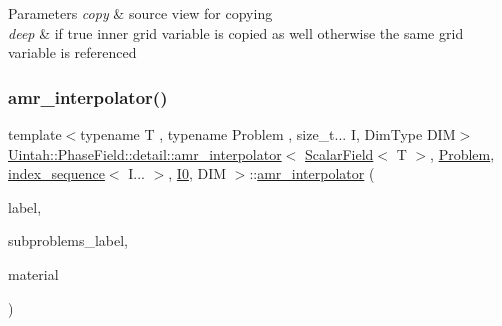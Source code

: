 \begin{DoxyParams}{Parameters}
{\em copy} & source view for copying \\
\hline
{\em deep} & if true inner grid variable is copied as well otherwise the same grid variable is referenced \\
\hline
\end{DoxyParams}
\mbox{\label{classUintah_1_1PhaseField_1_1detail_1_1amr__interpolator_3_01ScalarField_3_01T_01_4_00_01Problem64f2458f98b03e27672a091eecc4b696_a71dd7bddaaeff40500a9bb9e8c1d2885}} 
\subsubsection{\texorpdfstring{amr\+\_\+interpolator()}{amr\_interpolator()}\hspace{0.1cm}{\footnotesize\ttfamily [2/4]}}
{\footnotesize\ttfamily template$<$typename T , typename Problem , size\+\_\+t... I, Dim\+Type D\+IM$>$ \\
\hyperlink{classUintah_1_1PhaseField_1_1detail_1_1amr__interpolator}{Uintah\+::\+Phase\+Field\+::detail\+::amr\+\_\+interpolator}$<$ \hyperlink{structUintah_1_1PhaseField_1_1ScalarField}{Scalar\+Field}$<$ T $>$, \hyperlink{classUintah_1_1PhaseField_1_1Problem}{Problem}, \hyperlink{namespaceUintah_1_1PhaseField_a237de804d99512e50613aff7c94a9461}{index\+\_\+sequence}$<$ I... $>$, \hyperlink{namespaceUintah_1_1PhaseField_a547ce3002aa97fbd3ef3192a6eec8406abdd8ebcbdfd71d1125937e3012dc45fb}{I0}, D\+IM $>$\+::\hyperlink{classUintah_1_1PhaseField_1_1detail_1_1amr__interpolator}{amr\+\_\+interpolator} (\begin{DoxyParamCaption}\item[{const typename \hyperlink{structUintah_1_1PhaseField_1_1ScalarField_a7a77875e030da64c47ce9f6c22a06959}{Field\+::label\+\_\+type} \&}]{label,  }\item[{const Var\+Label $\ast$}]{subproblems\+\_\+label,  }\item[{int}]{material }\end{DoxyParamCaption})\hspace{0.3cm}{\ttfamily [inline]}}



